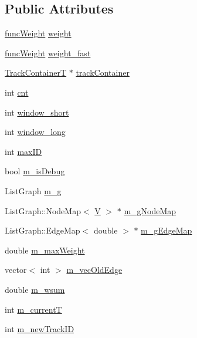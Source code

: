 \subsection*{\-Public \-Attributes}
\begin{DoxyCompactItemize}
\item 
\hyperlink{class_i_m_f_t_ae7436174afe28b7a25237c97b2b9f416}{func\-Weight} \hyperlink{class_i_m_f_t_ac25f8710b5133e975dd7be2e9909f0bd}{weight}
\item 
\hyperlink{class_i_m_f_t_ae7436174afe28b7a25237c97b2b9f416}{func\-Weight} \hyperlink{class_i_m_f_t_a9431008dbf21f96477c515c41b77014f}{weight\-\_\-fast}
\item 
\hyperlink{class_i_m_f_t_a8aad0b1bd309bfb92abb74ce45e549a9}{\-Track\-Container\-T} $\ast$ \hyperlink{class_i_m_f_t_a2b7798fca0fac14339c47ce517778560}{track\-Container}
\item 
int \hyperlink{class_i_m_f_t_aa470d46dee0f624f461d8854939cd6c5}{cnt}
\item 
int \hyperlink{class_i_m_f_t_ad2198a7256eb82e0c5ad0362abc5290a}{window\-\_\-short}
\item 
int \hyperlink{class_i_m_f_t_a90e2ffc6a77b2b27035c8dfc6cbb8378}{window\-\_\-long}
\item 
int \hyperlink{class_i_m_f_t_abb14e14b1278312f13d5e45bb0bedd47}{max\-I\-D}
\item 
bool \hyperlink{class_i_m_f_t_af10936c7ab5ea0b0d18e928365c6ff3d}{m\-\_\-is\-Debug}
\item 
\-List\-Graph \hyperlink{class_i_m_f_t_a03887af2ae2372fcbecc2525176bbef8}{m\-\_\-g}
\item 
\-List\-Graph\-::\-Node\-Map$<$ \hyperlink{class_i_m_f_t_ad22184fa80718f8e5087d8cec78a6323}{\-V} $>$ $\ast$ \hyperlink{class_i_m_f_t_a456c4e69b77870a87f0d6a86b33ce668}{m\-\_\-g\-Node\-Map}
\item 
\-List\-Graph\-::\-Edge\-Map$<$ double $>$ $\ast$ \hyperlink{class_i_m_f_t_a9629eb1da0d08013c87c4e679c176c6b}{m\-\_\-g\-Edge\-Map}
\item 
double \hyperlink{class_i_m_f_t_a157d578f41bcddf7355c9d0fc16c0f6e}{m\-\_\-max\-Weight}
\item 
vector$<$ int $>$ \hyperlink{class_i_m_f_t_a29f477074ca9cb6760c58c7312a0e2c6}{m\-\_\-vec\-Old\-Edge}
\item 
double \hyperlink{class_i_m_f_t_ac759c0713923c5a609ec3e90b942f606}{m\-\_\-wsum}
\item 
int \hyperlink{class_i_m_f_t_afd30e2f7af8158e10d95c1e55a05e17d}{m\-\_\-current\-T}
\item 
int \hyperlink{class_i_m_f_t_a1fbf73806f8ad8cc86261808f7c4ec09}{m\-\_\-new\-Track\-I\-D}
\end{DoxyCompactItemize}
